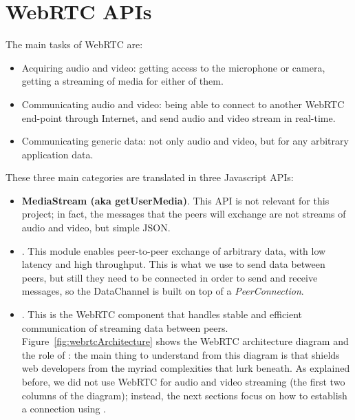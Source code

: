 \section{WebRTC APIs}
\label{sec:webrtc_api}
The main tasks of WebRTC are:
\begin{itemize}
	\item Acquiring audio and video: getting access to the microphone or camera, getting a streaming of media for either of them.
	\item Communicating audio and video: being able to connect to another WebRTC end-point through Internet, and send audio and video stream in real-time.
	\item Communicating generic data: not only audio and video, but for any arbitrary application data.
\end{itemize}
These three main categories are translated in three Javascript APIs:
\begin{itemize}
	\item\textbf{\textsf{MediaStream} (aka getUserMedia)}.
This API is not relevant for this project; in fact, the messages that the peers will exchange are not streams of audio and video, but simple JSON.
	\item\textbf{\RTCDataChannel}.
This module enables peer-to-peer exchange of arbitrary data, with low latency and high throughput. This is what we use to send data between peers, but still they need to be connected in order to send and receive messages, so the DataChannel is built on top of a \textit{PeerConnection}.
	\item\textbf{\RTCPeerConnection}.
This is the WebRTC component that handles stable and efficient communication of streaming data between peers. Figure~\ref{fig:webrtcArchitecture} shows the WebRTC architecture diagram and the role of \RTCPeerConnection: the main thing to understand from this diagram is that \RTCPeerConnection shields web developers from the myriad complexities that lurk beneath. As explained before, we did not use WebRTC for audio and video streaming (the first two columns of the diagram); instead, the next sections focus on how to establish a connection using \RTCPeerConnection.
\end{itemize}

